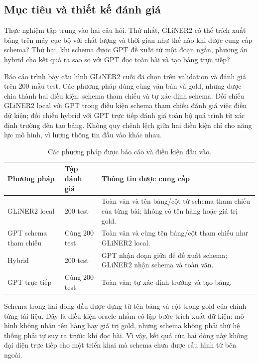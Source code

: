\subsection{Mục tiêu và thiết kế đánh giá}
Thực nghiệm tập trung vào hai câu hỏi. Thứ nhất, GLiNER2 có thể trích xuất bảng trên máy cục bộ với chất lượng và thời gian như thế nào khi được cung cấp schema? Thứ hai, khi schema được GPT đề xuất từ một đoạn ngắn, phương án hybrid cho kết quả ra sao so với GPT đọc toàn bài và tạo bảng trực tiếp?

Báo cáo trình bày cấu hình GLiNER2 cuối đã chọn trên validation và đánh giá trên 200 mẫu test. Các phương pháp dùng cùng văn bản và gold, nhưng được chia thành hai điều kiện: schema tham chiếu và tự xác định schema. Đối chiếu GLiNER2 local với GPT trong điều kiện schema tham chiếu đánh giá việc điền dữ kiện; đối chiếu hybrid với GPT trực tiếp đánh giá toàn bộ quá trình từ xác định trường đến tạo bảng. Không quy chênh lệch giữa hai điều kiện chỉ cho năng lực mô hình, vì lượng thông tin đầu vào khác nhau.

\begin{table}[H]
\centering\small
\begin{tabularx}{\linewidth}{@{}p{3.3cm}p{2.1cm}Y@{}}
\toprule\textbf{Phương pháp} & \textbf{Tập đánh giá} & \textbf{Thông tin được cung cấp}\\\midrule
GLiNER2 local & 200 test & Toàn văn và tên bảng/cột từ schema tham chiếu của từng bài; không có tên hàng hoặc giá trị gold.\\
GPT schema tham chiếu & Cùng 200 test & Toàn văn và cùng tên bảng/cột tham chiếu như GLiNER2 local.\\
Hybrid & 200 test & GPT nhận đoạn giữa để đề xuất schema; GLiNER2 nhận schema và toàn văn.\\
GPT trực tiếp & Cùng 200 test & Toàn văn; tự xác định trường và tạo bảng.\\
\bottomrule
\end{tabularx}
\caption{Các phương pháp được báo cáo và điều kiện đầu vào.}
\end{table}

Schema trong hai dòng đầu được dựng từ tên bảng và cột trong gold của chính từng tài liệu. Đây là điều kiện oracle nhằm cô lập bước trích xuất dữ kiện: mô hình không nhận tên hàng hay giá trị gold, nhưng schema không phải thứ hệ thống phải tự suy ra trước khi đọc bài. Vì vậy, kết quả của hai dòng này không đại diện trực tiếp cho một triển khai mà schema chưa được cấu hình từ bên ngoài.

